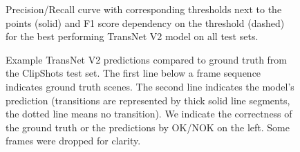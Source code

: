 \begin{figure}[h]
    
    \caption[Performance of the best TransNet V2 model]{Precision/Recall curve with corresponding thresholds next to the points (solid) and F1 score dependency on the threshold (dashed) for the best performing TransNet V2 model on all test sets.}
    \label{fig:transnetv2_prcurve}
\end{figure}



\begin{figure}
    \centering
    
    \caption[Example TransNet V2 predictions compared to ground truth]{Example TransNet V2 predictions compared to ground truth from the ClipShots test set. The first line below a frame sequence indicates ground truth scenes. The second line indicates the model's prediction (transitions are represented by thick solid line segments, the dotted line means no transition). We indicate the correctness of the ground truth or the predictions by OK/NOK on the left. Some frames were dropped for clarity.}
    \label{fig:transnetv2_predicted_transitions}
\end{figure}




